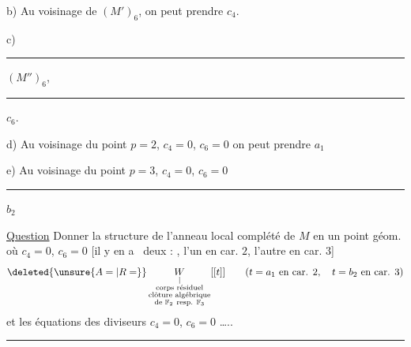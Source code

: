 
b) Au voisinage de $(M')_6$, on peut prendre $c_4$.

c) \rule{4em}{.3pt} $(M'')_6$, \rule{4em}{.3pt} $c_6$.

d) Au voisinage du point $p=2$, $c_4=0$, $c_6=0$ on peut prendre $a_1$

e) Au voisinage du point $p=3$, $c_4=0$, $c_6=0$ \rule{4em}{.3pt} $b_2$

\uline{Question} Donner la structure de l'anneau local complété de $M$ en un point géom. où $c_4=0$, $c_6=0$ [il y en a \deleted{\unsure{essentiellement}]}\ deux :  , l'un en car. $2$, l'autre en car. $3$]
\[
\deleted{\unsure{A=|R=}}\,\underset{\substack{|\\\text{corps résiduel}\\\text{clôture algébrique}\\\text{de }\mathbb F_2\ \text{resp. }\mathbb F_3}}{W}[[t]]
\qquad (t=a_1\ \text{en car. }2,\quad t=b_2\ \text{en car. }3)
\]
et les équations des diviseurs $c_4=0$, $c_6=0$ \ldots..

\noindent\rule{\linewidth}{.3pt}


